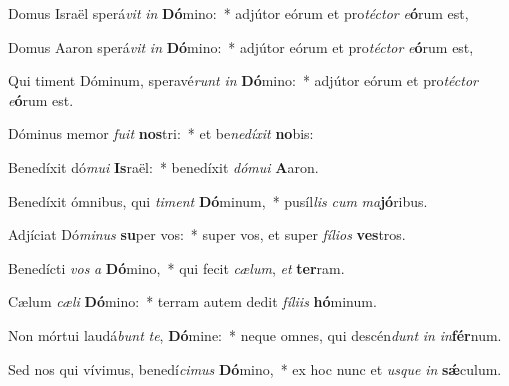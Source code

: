 \item Domus Israël sperá\textit{vit} \textit{in} \textbf{Dó}mino:~* adjútor eórum et pro\textit{téc}\textit{tor} \textit{e}\textbf{ó}rum est,
\item Domus Aaron sperá\textit{vit} \textit{in} \textbf{Dó}mino:~* adjútor eórum et pro\textit{téc}\textit{tor} \textit{e}\textbf{ó}rum est,
\item Qui timent Dóminum, speravé\textit{runt} \textit{in} \textbf{Dó}mino:~* adjútor eórum et pro\textit{téc}\textit{tor} \textit{e}\textbf{ó}rum est.
\item Dóminus memor \textit{fu}\textit{it} \textbf{nos}tri:~* et be\textit{ne}\textit{dí}\textit{xit} \textbf{no}bis:
\item Benedíxit dó\textit{mu}\textit{i} \textbf{Is}raël:~* benedíxit \textit{dó}\textit{mu}\textit{i} \textbf{A}aron.
\item Benedíxit ómnibus, qui \textit{ti}\textit{ment} \textbf{Dó}minum,~* pusíl\textit{lis} \textit{cum} \textit{ma}\textbf{jó}ribus.
\item Adjíciat Dó\textit{mi}\textit{nus} \textbf{su}per vos:~* super vos, et super \textit{fí}\textit{li}\textit{os} \textbf{ves}tros.
\item Benedícti \textit{vos} \textit{a} \textbf{Dó}mino,~* qui fecit \textit{cæ}\textit{lum}, \textit{et} \textbf{ter}ram.
\item Cælum \textit{cæ}\textit{li} \textbf{Dó}mino:~* terram autem dedit \textit{fí}\textit{li}\textit{is} \textbf{hó}minum.
\item Non mórtui laudá\textit{bunt} \textit{te}, \textbf{Dó}mine:~* neque omnes, qui descén\textit{dunt} \textit{in} \textit{in}\textbf{fér}num.
\item Sed nos qui vívimus, benedí\textit{ci}\textit{mus} \textbf{Dó}mino,~* ex hoc nunc et \textit{us}\textit{que} \textit{in} \textbf{sǽ}culum.
